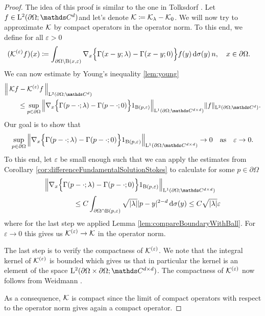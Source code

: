 \begin{proof}
  The idea of this proof is similar to the one in Tolksdorf \cite[Lemma 4.3.5]{tolksdorf}.
  Let $f \in \Ell^2(\partial\Omega; \C^d)$and let's denote $\mathcal{K} \coloneqq \mathcal{K}_\lambda - \mathcal{K}_0$. 
  We will now try to approximate $\mathcal{K}$ by compact operators in the operator norm.
  To this end, we define for all $\varepsilon > 0$
  \begin{align*}
    &(\mathcal{K}^{(\varepsilon)}f)(x) 
    \coloneqq \int_{\partial\Omega \setminus \mathrm{B}(x,\varepsilon)} \nabla_x \Big\{ \Gamma(x - y; \lambda) - \Gamma(x - y; 0) \Big\} f(y) \, {\operatorname{d}\!{\sigma}}(y) \, n, \quad x \in \partial\Omega.
  \end{align*}
  We can now estimate by Young's inequality \ref{lem:young} 
  \begin{align*}
    &\Big\| \,\K f - \K^{(\varepsilon)} f\, \Big\|_{\Ell^2(\partial\Omega; \C^d)} \\
    &\qquad\leq \sup_{p \in \partial\Omega} \Big\| \nabla_x \Big\{ \Gamma(p - \cdot; \lambda) - \Gamma(p - \cdot; 0) \Big\} 1_{\BB(p,\varepsilon)} \Big\|_{\Ell^1(\partial\Omega; \C^{d \times d})} \|f\|_{\Ell^2(\partial\Omega; \C^d)}.
  \end{align*}
  Our goal is to show that
  \begin{align*}
    \sup_{p \in \partial\Omega} \Big\| \nabla_x \Big\{ \Gamma(p - \cdot; \lambda) - \Gamma(p - \cdot; 0) \Big\} 1_{\BB(p,\varepsilon)} \Big\|_{\Ell^1(\partial\Omega; \C^{d \times d})} \to 0 \quad \text{as} \quad \varepsilon \to 0.
  \end{align*}
  To this end, let $\varepsilon$ be small enough such that we can apply the estimates from Corollary \ref{cor:differenceFundamentalSolutionStokes} to calculate for some $p \in \partial\Omega$
  \begin{align*}
    &\Big\| \nabla_x \Big\{ \Gamma(p - \cdot; \lambda) - \Gamma(p - \cdot; 0) \Big\} 1_{\BB(p,\varepsilon)} \Big\|_{\Ell^1(\partial\Omega; \C^{d \times d})}  \\
     &\qquad\qquad\leq C \int_{\partial\Omega \cap \BB(p, \varepsilon)} \sqrt{|\lambda|} |p - y|^{2 - d} \d\sigma(y) 
     \leq C \sqrt{|\lambda|} \varepsilon
  \end{align*}
  where for the last step we applied Lemma \ref{lem:compareBoundaryWithBall}.
  For $\varepsilon \to 0$ this gives us $\mathcal{K}^{(\varepsilon)} \to \mathcal{K}$ in the operator norm.

  The last step is to verify the compactness of $\mathcal{K}^{(\varepsilon)}$.
  We note that the integral kernel of $\mathcal{K}^{(\varepsilon)}$ is bounded which gives us that in particular the kernel is an element of the space $\Ell^2(\partial\Omega \times \partial\Omega; \C^{d \times d})$.
  The compactness of $\mathcal{K}^{(\varepsilon)}$ now follows from Weidmann \cite[Thm. 6.11]{weidmann}.

  As a consequence, $\mathcal{K}$ is compact since the limit of compact operators with respect to the operator norm gives again a compact operator.
\end{proof}

